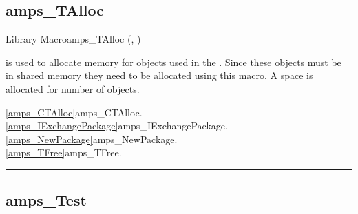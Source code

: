 \subsection{amps\_TAlloc}
\label{amps_TAlloc}


\begin{deftypefn}{Library Macro}{}{amps\_TAlloc}
(, )

\DESCRIPTION

 is used to allocate memory for objects used
in the .  Since these objects must be in
shared memory they need to be allocated using this macro.
A space is allocated for  number of  objects.

\SEEALSO
\vref{amps_CTAlloc}{amps\_CTAlloc}. \\
\vref{amps_IExchangePackage}{amps\_IExchangePackage}. \\
\vref{amps_NewPackage}{amps\_NewPackage}. \\
\vref{amps_TFree}{amps\_TFree}. \\

\end{deftypefn}


\noindent\rule{\textwidth}{1mm}

\subsection{amps\_Test}
\label{amps_Test}


